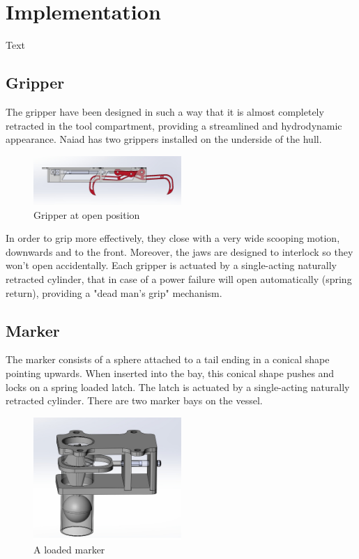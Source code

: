 \section{Implementation}\label{sec:implementation}
Text

\subsection{Gripper}
The gripper have been designed in such a way that it is almost completely retracted in the tool compartment, providing a streamlined and hydrodynamic appearance. Naiad has two grippers installed on the underside of the hull. 

\begin{figure}[h]
    \includegraphics[width=0.5\textwidth]{./figure/gripper_open.png}
    \caption{Gripper at open position}
    \label{fig:one_column_figure}
\end{figure}

In order to grip more effectively, they close with a very wide scooping motion, downwards and to the front. Moreover, the jaws are designed to interlock so they won't open accidentally. Each gripper is actuated by a single-acting naturally retracted cylinder, that in case of a power failure will open automatically (spring return), providing a "dead man's grip" mechanism.

\subsection{Marker}
The marker consists of a sphere attached to a tail ending in a conical shape pointing upwards. When inserted into the bay, this conical shape pushes and locks on a spring loaded latch. The latch is actuated by a single-acting naturally retracted cylinder. There are two marker bays on the vessel.

\begin{figure}[h]
    \includegraphics[width=0.5\textwidth]{./figure/marker_loaded.png}
    \caption{A loaded marker}
    \label{fig:one_column_figure}
\end{figure}

